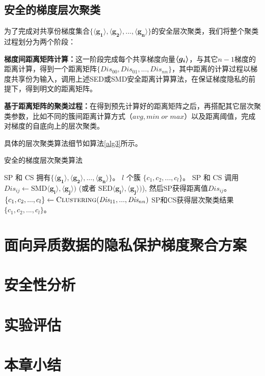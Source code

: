 \subsection{安全的梯度层次聚类}
为了完成对共享份梯度集合$\{\boldsymbol{\langle g_1\rangle}, \boldsymbol{\langle g_2\rangle},...,\boldsymbol{\langle g_n\rangle} \}$的安全层次聚类，我们将整个聚类过程划分为两个阶段：
\begin{compactenum}
	\item \textbf{梯度间距离矩阵计算：}这一阶段完成每个共享梯度向量$\boldsymbol{\langle g_i\rangle_{}}$，与其它$n-1$梯度的距离计算，得到一个距离矩阵$\{\textit{Dis}_{00}, \textit{Dis}_{01},...,\textit{Dis}_{nn}\}$，其中距离的计算过程以梯度共享份为输入，调用上述SED或SMD安全距离计算算法，在保证梯度隐私的前提下，得到明文的距离矩阵。
	\item \textbf{基于距离矩阵的聚类过程：}在得到预先计算好的距离矩阵之后，再搭配其它层次聚类参数，比如不同的簇间距离计算方式（$avg, min\; or\; max$）以及距离阈值，完成对梯度的自底向上的层次聚类。
\end{compactenum}
具体的层次聚类算法细节如算法\ref{alg3}所示。

\begin{algorithm}[htbp]
	\caption{安全的梯度层次聚类算法}
	\label{alg3}
	\begin{algorithmic}[1]
		\REQUIRE SP 和 CS 拥有$\{\boldsymbol{\langle g_1\rangle}, \boldsymbol{\langle g_2\rangle},...,\boldsymbol{\langle g_n\rangle} \}$。 
		\ENSURE $l$ 个簇 $\{c_1,c_2,...,c_l \}$。
			\STATE SP 和 CS 调用$\textit{Dis}_{ij} \xleftarrow{}\text{SMD}\boldsymbol{\langle g_i\rangle}, \boldsymbol{\langle g_j\rangle})$ (或者 $\text{SED}\boldsymbol{\langle g_i\rangle}, \boldsymbol{\langle g_j\rangle})$), 然后SP获得距离值$\textit{Dis}_{ij}$。
		\ENDFOR
		\ENDFOR
		\STATE $\{c_1,c_2,...,c_l \} \xleftarrow{} \textsc{Clustering}(\textit{Dis}_{11},...,\textit{Dis}_{nn})$ 
		\RETURN SP和CS获得层次聚类结果 $\{c_1,c_2,...,c_l \}$。
	\end{algorithmic}
\end{algorithm}



\section{面向异质数据的隐私保护梯度聚合方案}\label{4-framework}

\section{安全性分析}\label{4-analysis}

\section{实验评估}\label{4-exp}

\section{本章小结}\label{4-conclusion}
